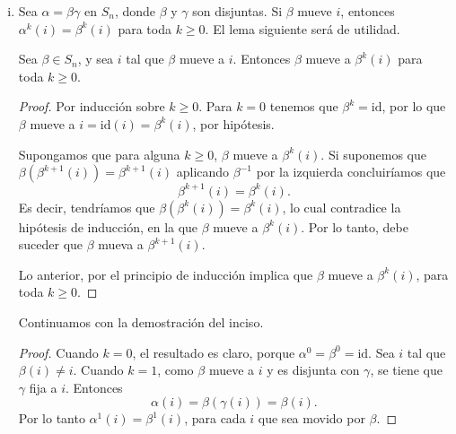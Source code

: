 \begin{enumerate}[(i)]
    \item
        Sea \( \alpha = \beta \gamma \) en \( S_n \), donde \( \beta \) y \( \gamma \) 
        son disjuntas. Si \( \beta \) mueve \( i \), 
        entonces \( \alpha^k ( i ) = \beta^k ( i ) \) para toda \( k\geq 0 \).
        El lema siguiente será de utilidad.
        \begin{lemma}\label{muevela-tambien}
            Sea \( \beta\in S_n \), y sea \( i \) tal que \( \beta \) mueve a \( i \).
            Entonces \( \beta \) mueve a \( \beta^k ( i ) \) para toda \( k\geq 0 \).
        \end{lemma}
        \begin{proof}
            Por inducción sobre \( k\geq 0 \). Para \( k=0 \) tenemos que 
            \( \beta^k = \mathrm{id} \), por lo que \( \beta \) mueve a \( i = \mathrm{id}(i) =
            \beta^k ( i ) \), por hipótesis.

            Supongamos que para alguna \( k \geq 0 \), \( \beta \) mueve a \( \beta^k ( i ) \).
            Si suponemos que 
            \( \beta \left( \beta^{k+1} ( i ) \right)  = \beta^{k+1} ( i ) \)
            aplicando \( \beta^{-1} \) por la izquierda
            concluiríamos que 
            \[
                \beta^{k+1} ( i ) = \beta^{k} ( i ).
            \]
            Es decir, tendríamos que \( \beta \left( \beta^{k} ( i ) \right) = 
            \beta^{k} ( i )\), lo cual contradice la hipótesis de inducción, en la que 
            \( \beta \) mueve a \( \beta^k ( i ) \). Por lo tanto, debe suceder que 
            \( \beta \) mueva a \( \beta^{k+1} ( i ) \). 

            Lo anterior, por el principio de inducción implica que 
            \( \beta \) mueve a \( \beta^{k} ( i ) \), para toda \( k \geq 0 \).
        \end{proof}

        Continuamos con la demostración del inciso.
        \begin{proof}
            Cuando \( k= 0 \), el resultado es claro, porque \( \alpha^0 = \beta^0 = \mathrm{id} \).
            Sea \( i \) tal que \( \beta \left( i \right) \neq i \).
            Cuando \( k = 1 \), como \( \beta \) mueve a \( i \) y es disjunta con \( \gamma\),
            se tiene que
            \( \gamma \) fija a \( i \). Entonces 
            \[
                \alpha ( i ) = 
                \beta \left( \gamma ( i ) \right)
                =
                \beta ( i ).
            \]
            Por lo tanto \( \alpha^1 ( i ) = \beta^1 ( i ) \), para cada \( i \) que sea movido
            por \( \beta \).


\end{proof}
\end{enumerate}
